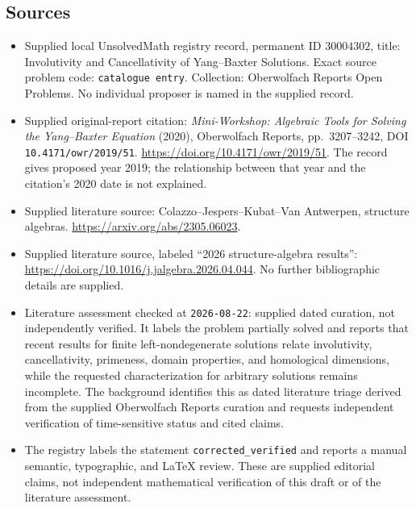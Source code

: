 \documentclass[11pt]{article}
\begin{document}
\subsection{Sources}
\begin{itemize}
\item Supplied local UnsolvedMath registry record, permanent ID \(30004302\), title: Involutivity and Cancellativity of Yang--Baxter Solutions. Exact source problem code: \texttt{catalogue entry}. Collection: Oberwolfach Reports Open Problems. No individual proposer is named in the supplied record.
\item Supplied original-report citation: \emph{Mini-Workshop: Algebraic Tools for Solving the Yang--Baxter Equation} (2020), Oberwolfach Reports, pp.~3207--3242, DOI \texttt{10.4171/owr/2019/51}. \url{https://doi.org/10.4171/owr/2019/51}. The record gives proposed year 2019; the relationship between that year and the citation's 2020 date is not explained.
\item Supplied literature source: Colazzo--Jespers--Kubat--Van Antwerpen, structure algebras. \url{https://arxiv.org/abs/2305.06023}.
\item Supplied literature source, labeled ``2026 structure-algebra results'': \url{https://doi.org/10.1016/j.jalgebra.2026.04.044}. No further bibliographic details are supplied.
\item Literature assessment checked at \texttt{2026-08-22}: supplied dated curation, not independently verified. It labels the problem partially solved and reports that recent results for finite left-nondegenerate solutions relate involutivity, cancellativity, primeness, domain properties, and homological dimensions, while the requested characterization for arbitrary solutions remains incomplete. The background identifies this as dated literature triage derived from the supplied Oberwolfach Reports curation and requests independent verification of time-sensitive status and cited claims.
\item The registry labels the statement \texttt{corrected\_verified} and reports a manual semantic, typographic, and LaTeX review. These are supplied editorial claims, not independent mathematical verification of this draft or of the literature assessment.
\end{itemize}
\end{document}
